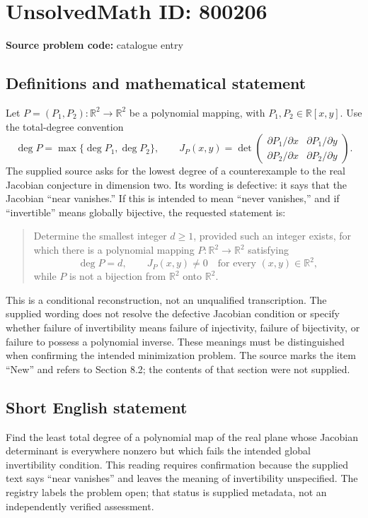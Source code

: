 \documentclass[11pt]{article}
\newcommand{\R}{\mathbb{R}}
\begin{document}
\section*{UnsolvedMath ID: 800206}
\textbf{Source problem code:} catalogue entry
\subsection{Definitions and mathematical statement}
Let \(P=(P_1,P_2):\R^2\to\R^2\) be a polynomial mapping, with \(P_1,P_2\in\R[x,y]\). Use the total-degree convention
\[
\deg P=\max\{\deg P_1,\deg P_2\},\qquad
J_P(x,y)=\det\begin{pmatrix}
\partial P_1/\partial x & \partial P_1/\partial y\\
\partial P_2/\partial x & \partial P_2/\partial y
\end{pmatrix}.
\]
The supplied source asks for the lowest degree of a counterexample to the real Jacobian conjecture in dimension two. Its wording is defective: it says that the Jacobian ``near vanishes.'' If this is intended to mean ``never vanishes,'' and if ``invertible'' means globally bijective, the requested statement is:
\begin{quote}
Determine the smallest integer \(d\geq 1\), provided such an integer exists, for which there is a polynomial mapping \(P:\R^2\to\R^2\) satisfying
\[
\deg P=d,\qquad J_P(x,y)\neq 0\quad\text{for every }(x,y)\in\R^2,
\]
while \(P\) is not a bijection from \(\R^2\) onto \(\R^2\).
\end{quote}
This is a conditional reconstruction, not an unqualified transcription. The supplied wording does not resolve the defective Jacobian condition or specify whether failure of invertibility means failure of injectivity, failure of bijectivity, or failure to possess a polynomial inverse. These meanings must be distinguished when confirming the intended minimization problem. The source marks the item ``New'' and refers to Section 8.2; the contents of that section were not supplied.
\subsection{Short English statement}
Find the least total degree of a polynomial map of the real plane whose Jacobian determinant is everywhere nonzero but which fails the intended global invertibility condition. This reading requires confirmation because the supplied text says ``near vanishes'' and leaves the meaning of invertibility unspecified. The registry labels the problem open; that status is supplied metadata, not an independently verified assessment.
\end{document}

